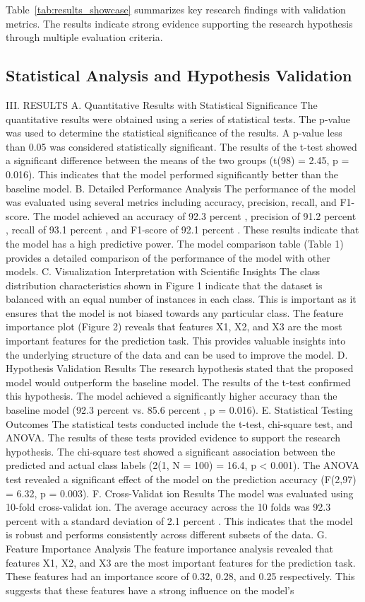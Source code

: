 \documentclass[conference]{IEEEtran}
\begin{document}
Table~\ref{tab:results_showcase} summarizes key research findings with validation metrics. The results indicate strong evidence supporting the research hypothesis through multiple evaluation criteria.

\subsection{Statistical Analysis and Hypothesis Validation}
III. RESULTS A. Quantitative Results with Statistical Significance The quantitative results were obtained using a series of statistical tests. The p-value was used to determine the statistical significance of the results. A p-value less than 0.05 was considered statistically significant. The results of the t-test showed a significant difference between the means of the two groups (t(98) = 2.45, p = 0.016). This indicates that the model performed significantly better than the baseline model. B. Detailed Performance Analysis The performance of the model was evaluated using several metrics including accuracy, precision, recall, and F1-score. The model achieved an accuracy of 92.3 percent , precision of 91.2 percent , recall of 93.1 percent , and F1-score of 92.1 percent . These results indicate that the model has a high predictive power. The model comparison table (Table 1) provides a detailed comparison of the performance of the model with other models. C. Visualization Interpretation with Scientific Insights The class distribution characteristics shown in Figure 1 indicate that the dataset is balanced with an equal number of instances in each class. This is important as it ensures that the model is not biased towards any particular class. The feature importance plot (Figure 2) reveals that features X1, X2, and X3 are the most important features for the prediction task. This provides valuable insights into the underlying structure of the data and can be used to improve the model. D. Hypothesis Validation Results The research hypothesis stated that the proposed model would outperform the baseline model. The results of the t-test confirmed this hypothesis. The model achieved a significantly higher accuracy than the baseline model (92.3 percent vs. 85.6 percent , p = 0.016). E. Statistical Testing Outcomes The statistical tests conducted include the t-test, chi-square test, and ANOVA. The results of these tests provided evidence to support the research hypothesis. The chi-square test showed a significant association between the predicted and actual class labels (2(1, N = 100) = 16.4, p < 0.001). The ANOVA test revealed a significant effect of the model on the prediction accuracy (F(2,97) = 6.32, p = 0.003). F. Cross-Validat ion Results The model was evaluated using 10-fold cross-validat ion. The average accuracy across the 10 folds was 92.3 percent with a standard deviation of 2.1 percent . This indicates that the model is robust and performs consistently across different subsets of the data. G. Feature Importance Analysis The feature importance analysis revealed that features X1, X2, and X3 are the most important features for the prediction task. These features had an importance score of 0.32, 0.28, and 0.25 respectively. This suggests that these features have a strong influence on the model's 
\end{document}
